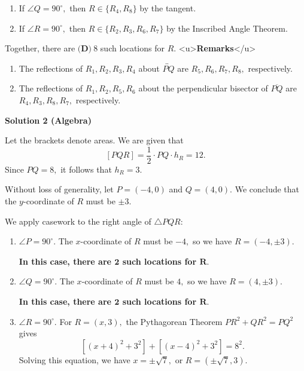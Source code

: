 \begin{enumerate}
\begin{enumerate}
        \item If $\angle Q=90^\circ,$ then $R\in\{R_4,R_8\}$ by the tangent.

        \item If $\angle R=90^\circ,$ then $R\in\{R_2,R_3,R_6,R_7\}$ by the Inscribed Angle Theorem.

            \end{enumerate}
            Together, there are $\boxed{\textbf{(D)}\ 8}$ such locations for $R.$
<u>\textbf{Remarks}</u>

            \begin{enumerate} 
        \item The reflections of $R_1,R_2,R_3,R_4$ about $\overleftrightarrow{PQ}$ are $R_5,R_6,R_7,R_8,$ respectively.

        \item The reflections of $R_1,R_2,R_5,R_6$ about the perpendicular bisector of $\overline{PQ}$ are $R_4,R_3,R_8,R_7,$ respectively.

            \end{enumerate}
            



\textbf{Solution 2 (Algebra)}

Let the brackets denote areas. We are given that 
 \[[PQR]=\frac12\cdot PQ\cdot h_R=12.\] Since $PQ=8,$ it follows that $h_R=3.$

 Without loss of generality, let $P=(-4,0)$ and $Q=(4,0).$ We conclude that the $y$-coordinate of $R$ must be $\pm3.$

 We apply casework to the right angle of $\triangle PQR:$

            \begin{enumerate} 
        \item $\angle P=90^\circ.$ The $x$-coordinate of $R$ must be $-4,$ so we have $R=(-4,\pm3).$ 

 \textbf{In this case, there are $\boldsymbol{2}$ such locations for $\boldsymbol{R.}$} 

 

  
        \item $\angle Q=90^\circ.$ The $x$-coordinate of $R$ must be $4,$ so we have $R=(4,\pm3).$ 

 \textbf{In this case, there are $\boldsymbol{2}$ such locations for $\boldsymbol{R.}$} 

 

  
        \item $\angle R=90^\circ.$ For $R=(x,3),$ the Pythagorean Theorem $PR^2+QR^2=PQ^2$ gives 
 \[\left[(x+4)^2+3^2\right]+\left[(x-4)^2+3^2\right]=8^2.\] Solving this equation, we have $x=\pm\sqrt7,$ or $R=\left(\pm\sqrt7,3\right).$ 


\end{enumerate}
\end{enumerate}
